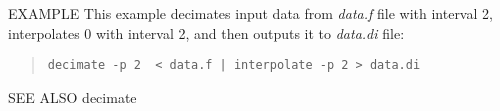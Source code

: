 \begin{options}
\end{options}

\begin{qsection}{EXAMPLE}
This example decimates input data from {\em data.f} file with interval 2,
interpolates 0 with interval 2, and then outputs it to {\em
data.di} file:
\begin{quote}
  \verb!decimate -p 2  < data.f | interpolate -p 2 > data.di!
\end{quote}
\end{qsection}

\begin{qsection}{SEE ALSO}
  decimate
\end{qsection}
